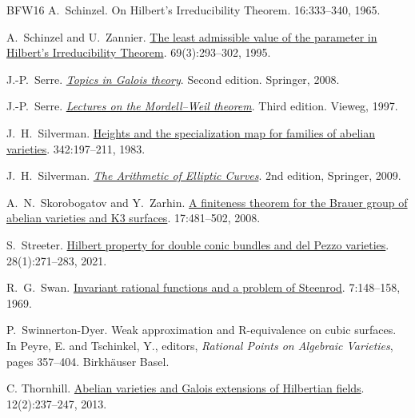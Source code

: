 \documentclass[10pt,a4paper]{amsart}
\theoremstyle{plain}
\theoremstyle{remark}
\numberwithin{theorem}{section}
\begin{document}
\begin{thebibliography}{BFW16}
A.~Schinzel.
\newblock On Hilbert's Irreducibility Theorem.
 16:333--340, 1965.

A.~Schinzel and U.~Zannier.
\newblock \href{https://doi.org/10.4064/aa-69-3-293-302 }{The least admissible value of the parameter in Hilbert's Irreducibility Theorem}.
 69(3):293--302, 1995.

J.-P.~Serre.
\newblock \href{https://doi.org/10.1201/b10588}{\em Topics in Galois theory}.
\newblock Second edition. Springer, 2008.

J.-P.~Serre.
\newblock \href{https://doi.org/10.1007/978-3-663-10632-6}{{\em Lectures on the Mordell--Weil theorem}}.
\newblock Third edition. Vieweg, 1997.

J.~H.~Silverman.
\newblock \href{https://doi.org/10.1515/crll.1983.342.197}{Heights and the specialization map for families of abelian varieties}.
 342:197--211, 1983.

J.~H.~Silverman.
\newblock \href{https://doi.org/10.1007/978-0-387-09494-6}{\em The Arithmetic of Elliptic Curves}.
\newblock 2nd edition, Springer, 2009.

A.~N.~Skorobogatov and Y.~Zarhin. 
\newblock \href{https://doi.org/10.1090/S1056-3911-07-00471-7}{A finiteness theorem for the Brauer group of abelian varieties and K3 surfaces}. 
 17:481--502, 2008.

S.~Streeter.
\newblock \href{https://dx.doi.org/10.4310/MRL.2021.v28.n1.a11}{Hilbert property for double conic bundles and del Pezzo varieties}.
 28(1):271--283, 2021.

R.~G.~Swan.
\newblock \href{https://doi.org/10.1007/BF01389798}{Invariant rational functions and a problem of Steenrod}.
 7:148--158, 1969.

P.~Swinnerton-Dyer. 
\newblock Weak approximation and R-equivalence on cubic surfaces. 
\newblock In Peyre, E. and Tschinkel, Y., editors, {\em Rational Points on Algebraic Varieties}, pages 357–404. Birkhäuser Basel.

C. Thornhill.
\newblock \href{https://doi.org/10.1017/S1474748012000680 }{Abelian varieties and Galois extensions of Hilbertian fields}.
 12(2):237--247, 2013.


\end{thebibliography}
\end{document}
